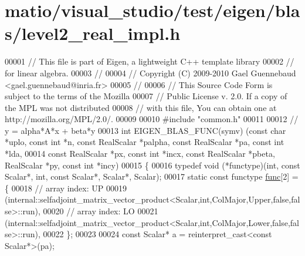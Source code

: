 \hypertarget{matio_2visual__studio_2test_2eigen_2blas_2level2__real__impl_8h_source}{}\section{matio/visual\+\_\+studio/test/eigen/blas/level2\+\_\+real\+\_\+impl.h}
\label{matio_2visual__studio_2test_2eigen_2blas_2level2__real__impl_8h_source}

\begin{DoxyCode}
00001 \textcolor{comment}{// This file is part of Eigen, a lightweight C++ template library}
00002 \textcolor{comment}{// for linear algebra.}
00003 \textcolor{comment}{//}
00004 \textcolor{comment}{// Copyright (C) 2009-2010 Gael Guennebaud <gael.guennebaud@inria.fr>}
00005 \textcolor{comment}{//}
00006 \textcolor{comment}{// This Source Code Form is subject to the terms of the Mozilla}
00007 \textcolor{comment}{// Public License v. 2.0. If a copy of the MPL was not distributed}
00008 \textcolor{comment}{// with this file, You can obtain one at http://mozilla.org/MPL/2.0/.}
00009 
00010 \textcolor{preprocessor}{#include "common.h"}
00011 
00012 \textcolor{comment}{// y = alpha*A*x + beta*y}
00013 \textcolor{keywordtype}{int} EIGEN\_BLAS\_FUNC(symv) (\textcolor{keyword}{const} \textcolor{keywordtype}{char} *uplo, \textcolor{keyword}{const} \textcolor{keywordtype}{int} *n, \textcolor{keyword}{const} RealScalar *palpha, \textcolor{keyword}{const} RealScalar *pa, \textcolor{keyword}{
      const} \textcolor{keywordtype}{int} *lda,
00014                            \textcolor{keyword}{const} RealScalar *px, \textcolor{keyword}{const} \textcolor{keywordtype}{int} *incx, \textcolor{keyword}{const} RealScalar *pbeta, RealScalar *py, \textcolor{keyword}{
      const} \textcolor{keywordtype}{int} *incy)
00015 \{
00016   \textcolor{keyword}{typedef} void (*functype)(int, \textcolor{keyword}{const} Scalar*, int, \textcolor{keyword}{const} Scalar*, Scalar*, Scalar);
00017   \textcolor{keyword}{static} \textcolor{keyword}{const} functype \hyperlink{structfunc}{func}[2] = \{
00018     \textcolor{comment}{// array index: UP}
00019     (internal::selfadjoint\_matrix\_vector\_product<Scalar,int,ColMajor,Upper,false,false>::run),
00020     \textcolor{comment}{// array index: LO}
00021     (internal::selfadjoint\_matrix\_vector\_product<Scalar,int,ColMajor,Lower,false,false>::run),
00022   \};
00023 
00024   \textcolor{keyword}{const} Scalar* a = \textcolor{keyword}{reinterpret\_cast<}\textcolor{keyword}{const }Scalar*\textcolor{keyword}{>}(pa);

\end{DoxyCode}

